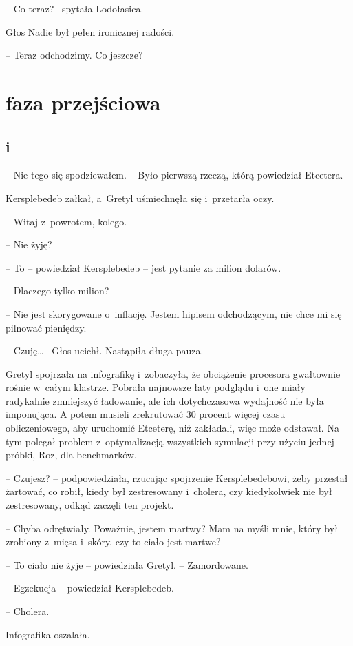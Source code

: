 \documentclass[oneside,polish,11pt,sfheadings]{mwbk}
\begin{document}
-- Co teraz?-- spytała Lodołasica.

Głos Nadie był pełen ironicznej radości. 

-- Teraz odchodzimy. Co jeszcze?

\part{faza przejściowa}

\chapter*{i}
-- Nie tego się spodziewałem. -- Było pierwszą rzeczą, którą powiedział
Etcetera.

Kersplebedeb załkał, a~Gretyl uśmiechnęła się i~przetarła oczy.

-- Witaj z~powrotem, kolego.

-- Nie żyję?

-- To -- powiedział Kersplebedeb -- jest pytanie za milion dolarów.

-- Dlaczego tylko milion?

-- Nie jest skorygowane o~inflację. Jestem hipisem odchodzącym, nie chce
mi się pilnować pieniędzy.

-- Czuję\ldots  -- Głos ucichł. Nastąpiła długa pauza. 

Gretyl spojrzała na
infografikę i~zobaczyła, że obciążenie procesora gwałtownie rośnie w~całym klastrze. Pobrała najnowsze łaty podglądu i~one miały radykalnie
zmniejszyć ładowanie, ale ich dotychczasowa wydajność nie była
imponująca. A potem musieli zrekrutować 30 procent więcej czasu
obliczeniowego, aby uruchomić Etceterę, niż zakładali, więc może
odstawał. Na tym polegał problem z~optymalizacją wszystkich symulacji
przy użyciu jednej próbki, Roz, dla benchmarków.

-- Czujesz? -- podpowiedziała, rzucając spojrzenie Kersplebedebowi, żeby
przestał żartować, co robił, kiedy był zestresowany i~cholera, czy
kiedykolwiek nie był zestresowany, odkąd zaczęli ten projekt.

-- Chyba odrętwiały. Poważnie, jestem martwy? Mam na myśli mnie, który
był zrobiony z~mięsa i~skóry, czy to ciało jest martwe?

-- To ciało nie żyje -- powiedziała Gretyl. -- Zamordowane.

-- Egzekucja -- powiedział Kersplebedeb.

-- Cholera.

Infografika oszalała.
\end{document}
